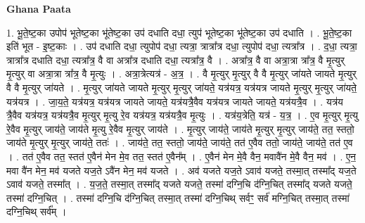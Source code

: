 \documentclass[17pt]{extarticle}
\begin{document}
\textbf{Ghana Paata } \newline

1. भू॒ते॒ष्ट॒का उपोप॑ भूतेष्ट॒का भू॑तेष्ट॒का उप॑ दधाति दधा॒ त्युप॑ भूतेष्ट॒का भू॑तेष्ट॒का उप॑ दधाति । . भू॒ते॒ष्ट॒का इति॑ भूत - इ॒ष्ट॒काः । . उप॑ दधाति दधा॒ त्युपोप॑ दधा॒ त्यत्रा॒ त्रात्रा᳚त्र दधा॒ त्युपोप॑ दधा॒ त्यत्रा᳚त्र । . द॒धा॒ त्यत्रा॒ त्रात्रा᳚त्र दधाति दधा॒ त्यत्रा᳚त्र॒ वै वा अत्रा᳚त्र दधाति दधा॒ त्यत्रा᳚त्र॒ वै । . अत्रा᳚त्र॒ वै वा अत्रा॒त्रा त्रा᳚त्र॒ वै मृ॒त्युर् मृ॒त्युर् वा अत्रा॒त्रा त्रा᳚त्र॒ वै मृ॒त्युः । . अत्रा॒त्रेत्यत्र॑ - अ॒त्र॒ । . वै मृ॒त्युर् मृ॒त्युर् वै वै मृ॒त्युर् जा॑यते जायते मृ॒त्युर् वै वै मृ॒त्युर् जा॑यते । . मृ॒त्युर् जा॑यते जायते मृ॒त्युर् मृ॒त्युर् जा॑यते॒ यत्र॑यत्र॒ यत्र॑यत्र जायते मृ॒त्युर् मृ॒त्युर् जा॑यते॒ यत्र॑यत्र । . जा॒य॒ते॒ यत्र॑यत्र॒ यत्र॑यत्र जायते जायते॒ यत्र॑यत्रै॒वैव यत्र॑यत्र जायते जायते॒ यत्र॑यत्रै॒व । . यत्र॑य त्रै॒वैव यत्र॑यत्र॒ यत्र॑यत्रै॒व मृ॒त्युर् मृ॒त्यु रे॒व यत्र॑यत्र॒ यत्र॑यत्रै॒व मृ॒त्युः । . यत्र॑य॒त्रेति॒ यत्र॑ - य॒त्र॒ । . ए॒व मृ॒त्युर् मृ॒त्यु रे॒वैव मृ॒त्युर् जाय॑ते॒ जाय॑ते मृ॒त्यु रे॒वैव मृ॒त्युर् जाय॑ते । . मृ॒त्युर् जाय॑ते॒ जाय॑ते मृ॒त्युर् मृ॒त्युर् जाय॑ते॒ तत॒ स्ततो॒ जाय॑ते मृ॒त्युर् मृ॒त्युर् जाय॑ते॒ ततः॑ । . जाय॑ते॒ तत॒ स्ततो॒ जाय॑ते॒ जाय॑ते॒ तत॑ ए॒वैव ततो॒ जाय॑ते॒ जाय॑ते॒ तत॑ ए॒व । . तत॑ ए॒वैव तत॒ स्तत॑ ए॒वैन॑ मेन मे॒व तत॒ स्तत॑ ए॒वैन᳚म् । . ए॒वैन॑ मेन मे॒वै वैन॒ मवावै॑न मे॒वै वैन॒ मव॑ । . ए॒न॒ मवा वै॑न मेन॒ मव॑ यजते यज॒ते ऽवै॑न मेन॒ मव॑ यजते । . अव॑ यजते यज॒ते ऽवाव॑ यजते॒ तस्मा॒त् तस्मा᳚द् यज॒ते ऽवाव॑ यजते॒ तस्मा᳚त् । . य॒ज॒ते॒ तस्मा॒त् तस्मा᳚द् यजते यजते॒ तस्मा॑ दग्नि॒चि द॑ग्नि॒चित् तस्मा᳚द् यजते यजते॒ तस्मा॑ दग्नि॒चित् । . तस्मा॑ दग्नि॒चि द॑ग्नि॒चित् तस्मा॒त् तस्मा॑ दग्नि॒चिथ् सर्वꣳ॒॒ सर्व॑ मग्नि॒चित् तस्मा॒त् तस्मा॑ दग्नि॒चिथ् सर्व᳚म् । \newline
\end{document}
